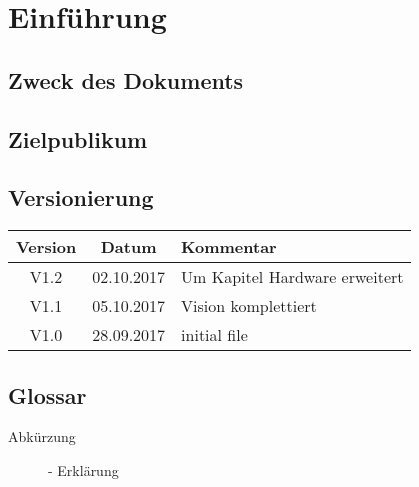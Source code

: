 \section{Einführung}
		\subsection{Zweck des Dokuments}
		\subsection{Zielpublikum}
		\subsection{Versionierung}
			\begin{table}[h]
				\centering
				\begin{tabularx}{\textwidth}{|c|c|X|}
				\hline
				\rowcolor{shadecolor}\textbf{Version} & \textbf{Datum} & \textbf{Kommentar}\\ \hline
                V1.2 & 02.10.2017 & Um Kapitel Hardware erweitert \\ \hline
        		V1.1 & 05.10.2017 & Vision komplettiert \\ \hline
				V1.0 & 28.09.2017 & initial file \\ \hline
				\end{tabularx}
			\end{table}
		\subsection{Glossar}
			\begin{description}
				\item[Abkürzung]- Erklärung
			\end{description}
